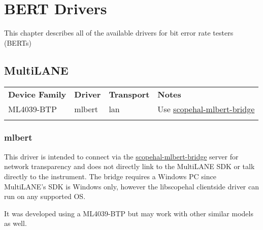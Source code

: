 \chapter{BERT Drivers}
\label{sec:bert-drivers}

This chapter describes all of the available drivers for bit error rate testers (BERTs)

\section{MultiLANE}

\begin{tabularx}{16cm}{lllX}
\thickhline
\textbf{Device Family} & \textbf{Driver} & \textbf{Transport} & \textbf{Notes} \\
\thickhline
ML4039-BTP & mlbert & lan & Use \href{https://github.com/ngscopeclient/scopehal-mlbert-bridge}{scopehal-mlbert-bridge} \\
\thickhline
\end{tabularx}

\subsection{mlbert}

This driver is intended to connect via the
\href{https://github.com/ngscopeclient/scopehal-mlbert-bridge}{scopehal-mlbert-bridge} server for network transparency
and does not directly link to the MultiLANE SDK or talk directly to the instrument. The bridge requires a Windows PC
since MultiLANE's SDK is Windows only, however the libscopehal clientside driver can run on any supported OS.

It was developed using a ML4039-BTP but may work with other similar models as well.
